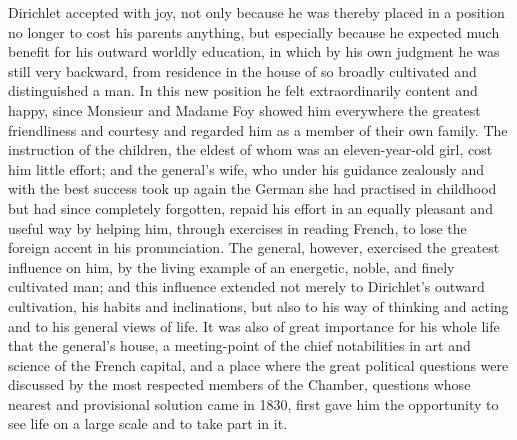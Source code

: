 \documentclass[11pt]{article}
\begin{document}
Dirichlet accepted with joy, not only because he was thereby placed in a position no longer to cost his parents anything, but especially because he expected much benefit for his outward worldly education, in which by his own judgment he was still very backward, from residence in the house of so broadly cultivated and distinguished a man. In this new position he felt extraordinarily content and happy, since Monsieur and Madame Foy showed him everywhere the greatest friendliness and courtesy and regarded him as a member of their own family. The instruction of the children, the eldest of whom was an eleven-year-old girl, cost him little effort; and the general's wife, who under his guidance zealously and with the best success took up again the German she had practised in childhood but had since completely forgotten, repaid his effort in an equally pleasant and useful way by helping him, through exercises in reading French, to lose the foreign accent in his pronunciation. The general, however, exercised the greatest influence on him, by the living example of an energetic, noble, and finely cultivated man; and this influence extended not merely to Dirichlet's outward cultivation, his habits and inclinations, but also to his way of thinking and acting and to his general views of life. It was also of great importance for his whole life that the general's house, a meeting-point of the chief notabilities in art and science of the French capital, and a place where the great political questions were discussed by the most respected members of the Chamber, questions whose nearest and provisional solution came in 1830, first gave him the opportunity to see life on a large scale and to take part in it.
\end{document}
